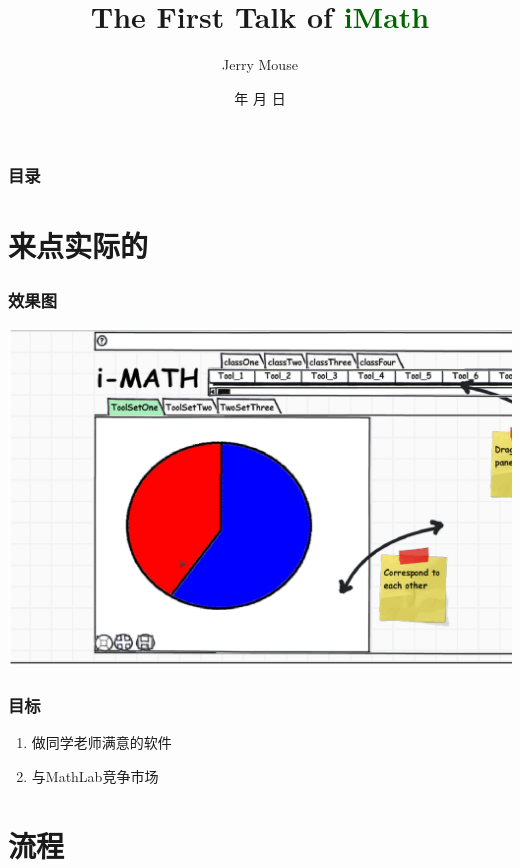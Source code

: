 \documentclass[dvipdfm,serif,mathserif]{beamer}
\renewcommand{\today}{\number\year 年 \number\month 月 \number\day 日}
\begin{document}
\title{The First Talk of \textcolor{darkgreen}{iMath}}
\date{\today}
\author{Jerry Mouse}

\begin{frame}
  \titlepage
\end{frame}
\begin{frame}\frametitle{目录}
\tableofcontents
\end{frame}



\section{来点实际的}

\begin{frame}
  \frametitle{效果图}
  \begin{center}
  \includegraphics[width=\textwidth]{init1.1.ps}
 \end{center}
\end{frame}

\begin{frame}
  \frametitle{目标}
\begin{enumerate}
 \item 做同学老师满意的软件
 \item 与MathLab竞争市场
\end{enumerate}
\end{frame}

\section{流程}
\end{document}
